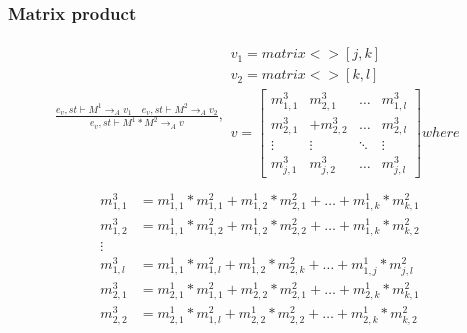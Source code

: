 \subsubsection{Matrix product}
\begin{minipage}{1.0\textwidth}
\begin{equation}
\begin{aligned}
	\frac { { e }_{ v },st\vdash { M }^{ 1 }{ \rightarrow  }_{ A }{ v }_{ 1 }\quad { e }_{ v },st\vdash { M }^{ 2 }{ \rightarrow  }_{ A }{ v }_{ 2 } }{ { e }_{ v },st\vdash { M }^{ 1 }*{ M }^{ 2 }{ \rightarrow  }_{ A }{ v } } ,\begin{matrix} { v }_{ 1 }=matrix<>[j,k] \\ { v }_{ 2 }=matrix<>[k,l] \\
	 v=\begin{bmatrix} { { m }_{ 1,1 }^{ 3 } } & { { m }_{ 2,1 }^{ 3 } } & \dots  & { m }_{ 1,l }^{ 3 }\\
{ { m }_{ 2,1 }^{ 3 } } &   +{ { m }_{ 2,2 }^{ 3 } } & \dots & { { m }_{ 2,l }^{ 3 } }
\\ \vdots  & \vdots & \ddots  & \vdots  \\
 { m }_{ j,1 }^{ 3 }& { { m }_{ j,2 }^{ 3 } } & \dots & { m }_{ j,l }^{ 3 } \end{bmatrix} where
\\ \end{matrix}
\end{aligned}
\end{equation}
\begin{equation*}
\begin{aligned}
{ { m }_{ 1,1 }^{ 3 } }  &= { { m }_{ 1,1 }^{ 1 } } *{ { m }_{ 1,1 }^{ 2 } }+ { { m }_{ 1,2 }^{ 1 } } *{ { m }_{ 2,1 }^{ 2 } }+\dots+ { { m }_{ 1,k }^{ 1 } } *{ { m }_{ k,1 }^{ 2 } }\\
{ { m }_{ 1,2 }^{ 3 } }  &= { { m }_{ 1,1 }^{ 1 } } *{ { m }_{ 1,2 }^{ 2 } }+ { { m }_{ 1,2 }^{ 1 } } *{ { m }_{ 2,2 }^{ 2 } }+\dots+ { { m }_{ 1,k }^{ 1 } } *{ { m }_{ k,2 }^{ 2 } }\\
\vdots\\
{ { m }_{ 1,l }^{ 3 } }  &= { { m }_{ 1,1 }^{ 1 } } *{ { m }_{ 1,l }^{ 2 } }+ { { m }_{ 1,2 }^{ 1 } } *{ { m }_{ 2,k }^{ 2 } }+\dots+ { { m }_{ 1,j }^{ 1 } } *{ { m }_{ j,l }^{ 2 } }\\
{ { m }_{ 2,1 }^{ 3 } }  &= { { m }_{ 2,1 }^{ 1 } } *{ { m }_{ 1,1 }^{ 2 } }+ { { m }_{ 2,2 }^{ 1 } } *{ { m }_{ 2,1 }^{ 2 } }+\dots+ { { m }_{ 2,k }^{ 1 } } *{ { m }_{ k,1 }^{ 2 } }\\
{ { m }_{ 2,2 }^{ 3 } }  &= { { m }_{ 2,1 }^{ 1 } } *{ { m }_{ 1,l }^{ 2 } }+ { { m }_{ 2,2 }^{ 1 } } *{ { m }_{ 2,2 }^{ 2 } }+\dots+ { { m }_{ 2,k }^{ 1 } } *{ { m }_{ k,2 }^{ 2 } }\\

\end{aligned}
\end{equation*}
\end{minipage}
